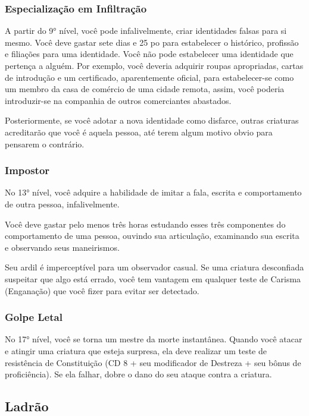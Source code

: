 \documentclass{RPG_Adventure}[2021/10/20]
\begin{document}
\subsubsection{Especialização em Infiltração}%

A partir do 9° nível, você pode infalivelmente, criar identidades falsas para si
mesmo. Você deve gastar sete dias e 25 po para estabelecer o histórico,
profissão e filiações para uma identidade. Você não pode estabelecer uma
identidade que pertença a alguém. Por exemplo, você deveria adquirir roupas
apropriadas, cartas de introdução e um certificado, aparentemente oficial, para
estabelecer-se como um membro da casa de comércio de uma cidade remota, assim,
você poderia introduzir-se na companhia de outros comerciantes abastados.

Posteriormente, se você adotar a nova identidade como disfarce, outras criaturas
acreditarão que você é aquela pessoa, até terem algum motivo obvio para pensarem
o contrário.

\subsubsection{Impostor}%

No 13° nível, você adquire a habilidade de imitar a fala, escrita e
comportamento de outra pessoa, infalivelmente.

Você deve gastar pelo menos três horas estudando esses três componentes do
comportamento de uma pessoa, ouvindo sua articulação, examinando sua escrita e
observando seus maneirismos.

Seu ardil é imperceptível para um observador casual. Se uma criatura desconfiada
suspeitar que algo está errado, você tem vantagem em qualquer teste de Carisma
(Enganação) que você fizer para evitar ser detectado.

\subsubsection{Golpe Letal}%

No 17° nível, você se torna um mestre da morte instantânea. Quando você atacar e
atingir uma criatura que esteja surpresa, ela deve realizar um teste de
resistência de Constituição (CD 8 + seu modificador de Destreza + seu bônus de
proficiência). Se ela falhar, dobre o dano do seu ataque contra a criatura.

\subsection*{Ladrão}%
\label{sub:ladrao}
\end{document}
